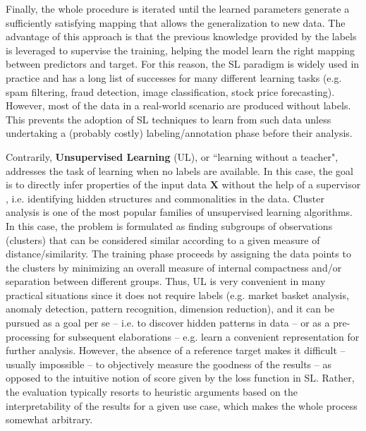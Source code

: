 Finally, the whole procedure is iterated until the learned parameters generate a sufficiently satisfying mapping that allows the generalization to new data. 
The advantage of this approach is that the previous knowledge provided by the labels is leveraged to supervise the training, helping the model learn the right mapping between predictors and target.
For this reason, the SL paradigm is widely used in practice and has a long list of successes for many different learning tasks (e.g. spam filtering, fraud detection, image classification, stock price forecasting).
However, most of the data in a real-world scenario are produced without labels. This prevents the adoption of SL techniques to learn from such data unless undertaking a (probably costly) labeling/annotation phase before their analysis. 

Contrarily, \textbf{Unsupervised Learning} (UL), or ``learning without a teacher", addresses the task of learning when no labels are available. 
In this case, the goal is to directly infer properties of the input data $\boldsymbol X$ without the help of a supervisor \cite[Chapter 14]{friedman2009elements}, i.e. identifying hidden structures and commonalities in the data.
Cluster analysis is one of the most popular families of  unsupervised learning algorithms.
In this case, the problem is formulated as finding subgroups of observations (clusters) that can be considered similar according to a given measure of distance/similarity.
The training phase proceeds by assigning the data points to the clusters by minimizing an overall measure of internal compactness and/or separation between different groups.
Thus, UL is very convenient in many practical situations since it does not require labels (e.g. market basket analysis, anomaly detection, pattern recognition, dimension reduction), and it can be pursued as a goal per se -- i.e. to discover hidden patterns in data -- or as a pre-processing for subsequent elaborations -- e.g. learn a convenient representation for further analysis.
However, the absence of a reference target makes it difficult -- usually impossible -- to objectively measure the goodness of the results -- as opposed to the intuitive notion of score given by the loss function in SL.
Rather, the evaluation typically resorts to heuristic arguments based on the interpretability of the results for a given use case, which makes the whole process somewhat arbitrary.


